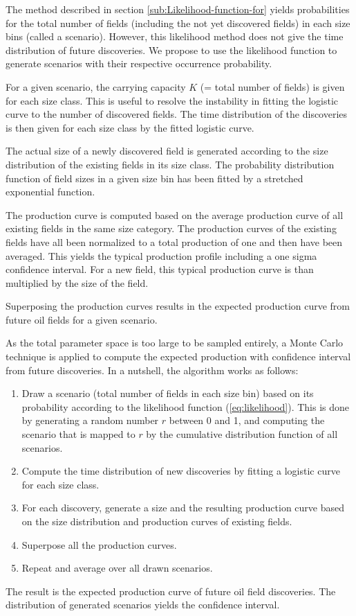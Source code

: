 \documentclass[review]{elsarticle}
\begin{document}
The method described in section \ref{sub:Likelihood-function-for}
yields probabilities for the total number of fields (including the
not yet discovered fields) in each size bins (called a scenario).
However, this likelihood method does not give the time distribution
of future discoveries. We propose to use the likelihood function to
generate scenarios with their respective occurrence probability.

For a given scenario, the carrying capacity $K$ (= total number of
fields) is given for each size class. This is useful to resolve
the instability in fitting the logistic curve to the number of discovered
fields. The time distribution of the discoveries is then given for
each size class by the fitted logistic curve.

The actual size of a newly discovered field is generated according
to the size distribution of the existing fields in its size class.
The probability distribution function of field sizes in a given size
bin has been fitted by a stretched exponential function.

The production curve is computed based on the average production curve
of all existing fields in the same size category. The production curves
of the existing fields have all been normalized to a total production
of one and then have been averaged. This yields the typical production
profile including a one sigma confidence interval. For a new field,
this typical production curve is than multiplied by the size of the
field.

Superposing the production curves results in the expected production
curve from future oil fields for a given scenario.

As the total parameter space is too large to be sampled entirely,
a Monte Carlo technique is applied to compute the expected production
with confidence interval from future discoveries. In a nutshell, the
algorithm works as follows:
\begin{enumerate}
\item Draw a scenario (total number of fields in each size bin) based on its probability according to the likelihood function (\ref{eq:likelihood}). This is done by generating a random number $r$ between 0 and 1, and computing the scenario that is mapped to $r$ by the cumulative distribution function of all scenarios.
\item Compute the time distribution of new discoveries by fitting a logistic
curve for each size class.
\item For each discovery, generate a size and the resulting production curve
based on the size distribution and production curves of existing fields.
\item Superpose all the production curves.
\item Repeat and average over all drawn scenarios.
\end{enumerate}
The result is the expected production curve of future oil field discoveries.
The distribution of generated scenarios yields the confidence interval.
\end{document}
